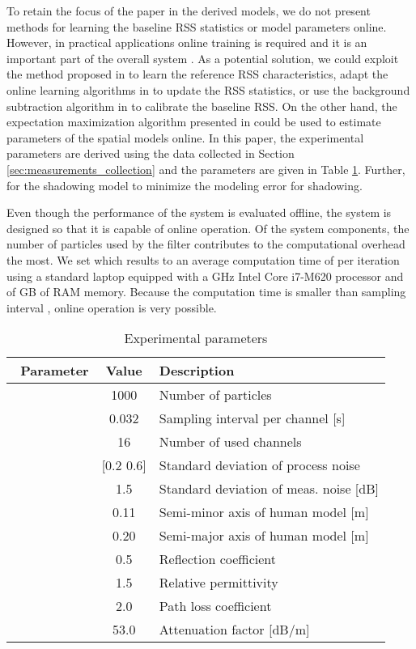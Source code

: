 \documentclass[journal, 10pt, twocolumn, balance]{IEEEtran}
\begin{document}
To retain the focus of the paper in the derived models, we do not present methods for learning the baseline RSS statistics or model parameters online. However, in practical applications online training is required and it is an important part of the overall system \cite{Kaltiokallio2012,Zheng2012,edelstein2013}. As a potential solution, we could exploit the method proposed in \cite{Kaltiokallio2012} to learn the reference RSS characteristics, adapt the online learning algorithms in \cite{Zheng2012} to update the RSS statistics, or use the background subtraction algorithm in \cite{edelstein2013} to calibrate the baseline RSS. On the other hand, the expectation maximization algorithm presented in \cite{li2011} could be used to estimate parameters of the spatial models online. In this paper, the experimental parameters are derived using the data collected in Section \ref{sec:measurements_collection} and the parameters are given in Table \ref{table:experimental_parameters}. Further,  for the shadowing model to minimize the modeling error for shadowing.

Even though the performance of the system is evaluated offline, the system is designed so that it is capable of online operation. Of the system components, the number of particles used by the filter contributes to the computational overhead the most. We set  which results to an average computation time of  per iteration using a standard laptop equipped with a  GHz Intel Core i7-M620 processor and  of GB of RAM memory. Because the computation time is smaller than sampling interval , online operation is very possible.


\begin{table}[!t]
    \caption{Experimental parameters} \centering \begin{tabular}{c c l} \hline\hline\ Parameter & Value & Description \\
        \hline   & 1000  &  Number of particles \\  & 0.032  &  Sampling interval per channel [s] \\  & 16  &  Number of used channels \\  & [0.2 0.6] & Standard deviation of process noise \\  & 1.5 & Standard deviation of meas. noise [dB] \\  & 0.11  & Semi-minor axis of human model [m] \\  & 0.20 & Semi-major axis of human model [m]  \\  & 0.5 & Reflection coefficient \\  & 1.5 & Relative permittivity \\  & 2.0 & Path loss coefficient \\  & 53.0 & Attenuation factor [dB/m] \\ 
        \hline \end{tabular}
        \label{table:experimental_parameters} \end{table}
\end{document}

